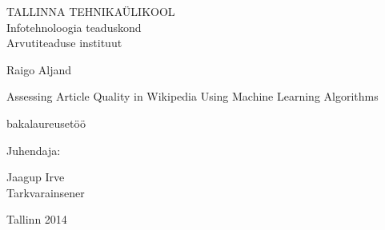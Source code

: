 \begin{titlepage}
	\newcommand{\fontsizex}[2]{{\fontsize{#1}{#1}\selectfont #2}}
	\newcommand{\fourteen}[1]{\fontsizex{14pt}{#1}}
	\newcommand{\twelve}[1]{\fontsizex{12pt}{#1}}
	
	\begin{center}
		\fourteen{TALLINNA TEHNIKAÜLIKOOL \\
		Infotehnoloogia teaduskond \\
		Arvutiteaduse instituut}
		
		\vfill
		
		\fourteen{Raigo Aljand} \\
		
		\vspace{7mm}
		
		\fontsizex{20pt}{Assessing Article Quality in Wikipedia
		Using Machine Learning Algorithms} \\
		
		\vspace{7mm}
		
		\twelve{bakalaureusetöö}
	\end{center}

	\vspace{20mm}
		
	\begin{flushright}
		\twelve{Juhendaja:}
		\begin{minipage}{35mm}
			\fourteen{
			Jaagup Irve \\
			Tarkvarainsener}
		\end{minipage}
	\end{flushright}
	
	\vfill
	
	\begin{center}	
		\twelve{Tallinn 2014}
	\end{center}
\end{titlepage}